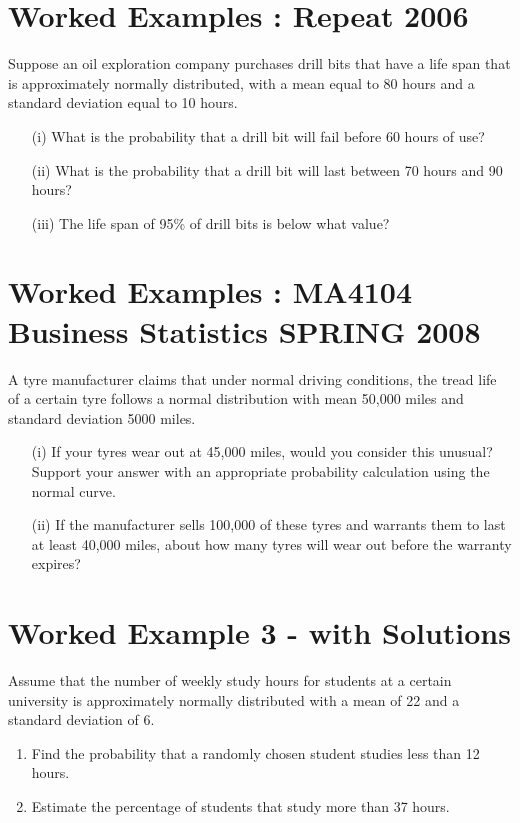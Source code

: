 

\section{Worked Examples : Repeat 2006}
Suppose an oil exploration company purchases drill bits that have a life span that is approximately normally distributed, with a mean equal to 80 hours and a standard deviation equal to 10 hours.

\begin{itemize}
\item[(i)]What is the probability that a drill bit will fail before 60 hours of use?

\item[(ii)]What is the probability that a drill bit will last between 70 hours and 90 hours?

\item[(iii)]The life span of 95\% of drill bits is below what value?

\end{itemize}


\section{Worked Examples : MA4104 Business Statistics SPRING 2008}

A tyre manufacturer claims that under normal driving conditions, the tread life of a certain tyre follows a normal distribution with mean 50,000 miles and standard deviation 5000 miles. 

\begin{itemize}
\item[(i)] If your tyres wear out at 45,000 miles, would you consider this unusual? Support your answer with an appropriate probability calculation using the normal curve. 

\item[(ii)] If the manufacturer sells 100,000 of these tyres and warrants them to last at least 40,000 miles, about how many tyres will wear out before the warranty expires? 
\end{itemize}
\section{Worked Example 3 - with Solutions}
Assume that the number of weekly study hours for students at a certain university
is approximately normally distributed with a mean of 22 and a standard deviation
of 6.
\begin{enumerate}
\item Find the probability that a randomly chosen student studies less than 12
hours.
\item Estimate the percentage of students that study more than 37 hours.
\end{enumerate}

